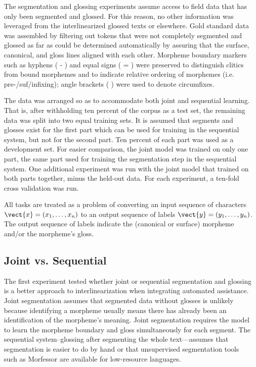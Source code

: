 The segmentation and glossing experiments assume access to field data that has only been segmented and glossed. For this reason, no other information was leveraged from the interlinearized glossed texts or elsewhere. Gold standard data was assembled by filtering out tokens that were not completely segmented and glossed as far as could be determined automatically by assuring that the surface, canonical, and gloss lines aligned with each other. 
Morpheme boundary markers such as hyphens ( - ) and equal signs ( = ) were preserved to distinguish clitics from bound morphemes and to indicate relative ordering of morphemes (i.e. pre-/suf/infixing); angle brackets ( \textlangle{}\textrangle{} ) were used to denote circumfixes. 

The data was arranged so as to accommodate both joint and sequential learning. That is, after withholding ten percent of the corpus as a test set, the remaining data was split into two equal training sets. It is assumed that segments and glosses exist for the first part which can be used for training in the sequential system, but not for the second part. Ten percent of each part was used as a development set. For easier comparison, the joint model was trained on only one part, the same part used for training the segmentation step in the sequential system. One additional experiment was run with the joint model that trained on both parts together, minus the held-out data. For each experiment, a ten-fold cross validation was run. 

All tasks are treated as a problem of converting an input sequence of characters $\vect{x} = (x_1, \ldots, x_n)$ to an output sequence of labels $\vect{y} = (y_1, \ldots, y_n)$. The output sequence of labels indicate the (canonical or surface) morpheme and/or the morpheme's gloss. 


\subsection{Joint vs. Sequential}
\label{sec:joint}

The first experiment tested whether joint or sequential segmentation and glossing is a better approach to interlinearization when integrating automated assistance. Joint segmentation assumes that segmented data without glosses is unlikely because identifying a morpheme usually means there has already been an identification of the morpheme's meaning.
Joint segmentation requires the model to learn the morpheme boundary and gloss simultaneously for each segment. The sequential system--glossing after segmenting the whole text---assumes that segmentation is easier to do by hand or that unsupervised segmentation tools such as Morfessor \citep{smit-etal-2014-morfessor} are available for low-resource languages. 

